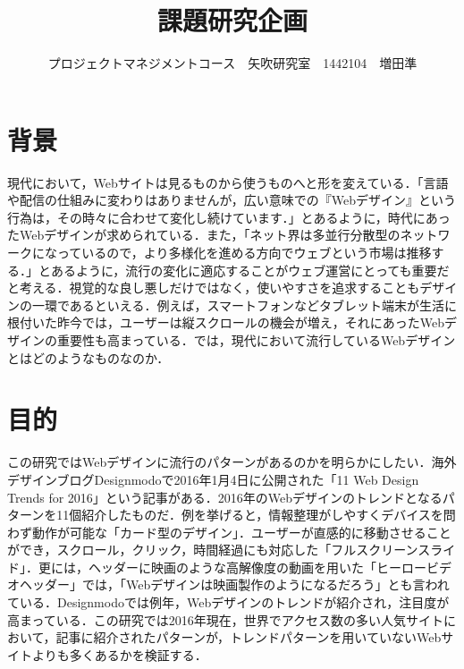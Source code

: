 \documentclass[uplatex,twocolumn,dvipdfmx]{jsarticle}
\title{\vspace{-5mm}\fontsize{14pt}{0pt}\selectfont 課題研究企画}
\author{\normalsize プロジェクトマネジメントコース　矢吹研究室　1442104　増田準}
\date{}
\begin{document}
\fontsize{10.5pt}{\baselineskip}\selectfont
\maketitle






\section{背景}
現代において，Webサイトは見るものから使うものへと形を変えている．「言語や配信の仕組みに変わりはありませんが，広い意味での『Webデザイン』という行為は，その時々に合わせて変化し続けています\cite{bib002}．」とあるように，時代にあったWebデザインが求められている．また，「ネット界は多並行分散型のネットワークになっているので，より多様化を進める方向でウェブという市場は推移する\cite{bib001}．」とあるように，流行の変化に適応することがウェブ運営にとっても重要だと考える．視覚的な良し悪しだけではなく，使いやすさを追求することもデザインの一環であるといえる．例えば，スマートフォンなどタブレット端末が生活に根付いた昨今では，ユーザーは縦スクロールの機会が増え，それにあったWebデザインの重要性も高まっている．では，現代において流行しているWebデザインとはどのようなものなのか．

\section{目的}
この研究ではWebデザインに流行のパターンがあるのかを明らかにしたい．海外デザインブログDesignmodoで2016年1月4日に公開された「11 Web Design Trends for 2016\cite{bib004}」という記事がある．2016年のWebデザインのトレンドとなるパターンを11個紹介したものだ．例を挙げると，情報整理がしやすくデバイスを問わず動作が可能な「カード型のデザイン」．ユーザーが直感的に移動させることができ，スクロール，クリック，時間経過にも対応した「フルスクリーンスライド」．更には，ヘッダーに映画のような高解像度の動画を用いた「ヒーロービデオヘッダー」では，「Webデザインは映画製作のようになるだろう」とも言われている．Designmodoでは例年，Webデザインのトレンドが紹介され，注目度が高まっている．この研究では2016年現在，世界でアクセス数の多い人気サイトにおいて，記事に紹介されたパターンが，トレンドパターンを用いていないWebサイトよりも多くあるかを検証する．
\end{document}
